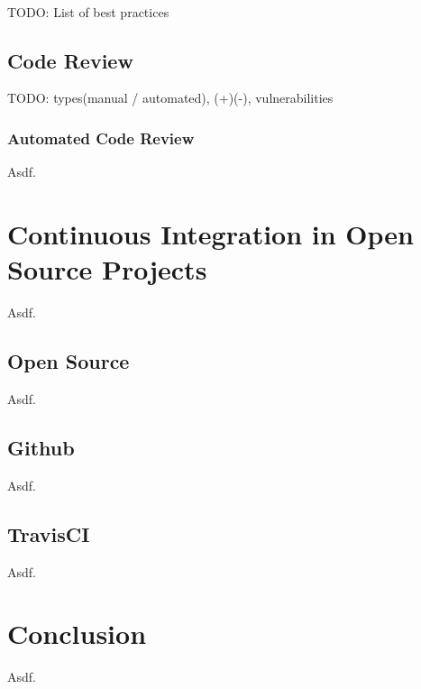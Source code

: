 \hfill\\
{\color{red}TODO: List of best practices}

\section{Code Review}

{\color{red}TODO: types(manual / automated), (+)(-), vulnerabilities}

\subsection{Automated Code Review}

Asdf.

\chapter{Continuous Integration in Open Source Projects}

Asdf.

\section{Open Source}

Asdf.

\section{Github}

Asdf.

\section{TravisCI}

Asdf.

\chapter{Conclusion}

Asdf.
